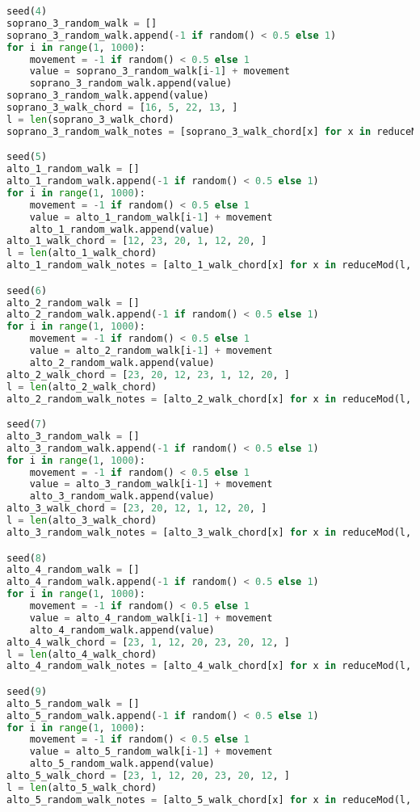\begin{lstlisting}[language=Python, caption=Invocation Source Code]
seed(4)
soprano_3_random_walk = []
soprano_3_random_walk.append(-1 if random() < 0.5 else 1)
for i in range(1, 1000):
    movement = -1 if random() < 0.5 else 1
    value = soprano_3_random_walk[i-1] + movement
    soprano_3_random_walk.append(value)
soprano_3_random_walk.append(value)
soprano_3_walk_chord = [16, 5, 22, 13, ]
l = len(soprano_3_walk_chord)
soprano_3_random_walk_notes = [soprano_3_walk_chord[x] for x in reduceMod(l, soprano_3_random_walk)]

seed(5)
alto_1_random_walk = []
alto_1_random_walk.append(-1 if random() < 0.5 else 1)
for i in range(1, 1000):
    movement = -1 if random() < 0.5 else 1
    value = alto_1_random_walk[i-1] + movement
    alto_1_random_walk.append(value)
alto_1_walk_chord = [12, 23, 20, 1, 12, 20, ]
l = len(alto_1_walk_chord)
alto_1_random_walk_notes = [alto_1_walk_chord[x] for x in reduceMod(l, alto_1_random_walk)]

seed(6)
alto_2_random_walk = []
alto_2_random_walk.append(-1 if random() < 0.5 else 1)
for i in range(1, 1000):
    movement = -1 if random() < 0.5 else 1
    value = alto_2_random_walk[i-1] + movement
    alto_2_random_walk.append(value)
alto_2_walk_chord = [23, 20, 12, 23, 1, 12, 20, ]
l = len(alto_2_walk_chord)
alto_2_random_walk_notes = [alto_2_walk_chord[x] for x in reduceMod(l, alto_2_random_walk)]

seed(7)
alto_3_random_walk = []
alto_3_random_walk.append(-1 if random() < 0.5 else 1)
for i in range(1, 1000):
    movement = -1 if random() < 0.5 else 1
    value = alto_3_random_walk[i-1] + movement
    alto_3_random_walk.append(value)
alto_3_walk_chord = [23, 20, 12, 1, 12, 20, ]
l = len(alto_3_walk_chord)
alto_3_random_walk_notes = [alto_3_walk_chord[x] for x in reduceMod(l, alto_3_random_walk)]

seed(8)
alto_4_random_walk = []
alto_4_random_walk.append(-1 if random() < 0.5 else 1)
for i in range(1, 1000):
    movement = -1 if random() < 0.5 else 1
    value = alto_4_random_walk[i-1] + movement
    alto_4_random_walk.append(value)
alto_4_walk_chord = [23, 1, 12, 20, 23, 20, 12, ]
l = len(alto_4_walk_chord)
alto_4_random_walk_notes = [alto_4_walk_chord[x] for x in reduceMod(l, alto_4_random_walk)]

seed(9)
alto_5_random_walk = []
alto_5_random_walk.append(-1 if random() < 0.5 else 1)
for i in range(1, 1000):
    movement = -1 if random() < 0.5 else 1
    value = alto_5_random_walk[i-1] + movement
    alto_5_random_walk.append(value)
alto_5_walk_chord = [23, 1, 12, 20, 23, 20, 12, ]
l = len(alto_5_walk_chord)
alto_5_random_walk_notes = [alto_5_walk_chord[x] for x in reduceMod(l, alto_5_random_walk)]


\end{lstlisting}
